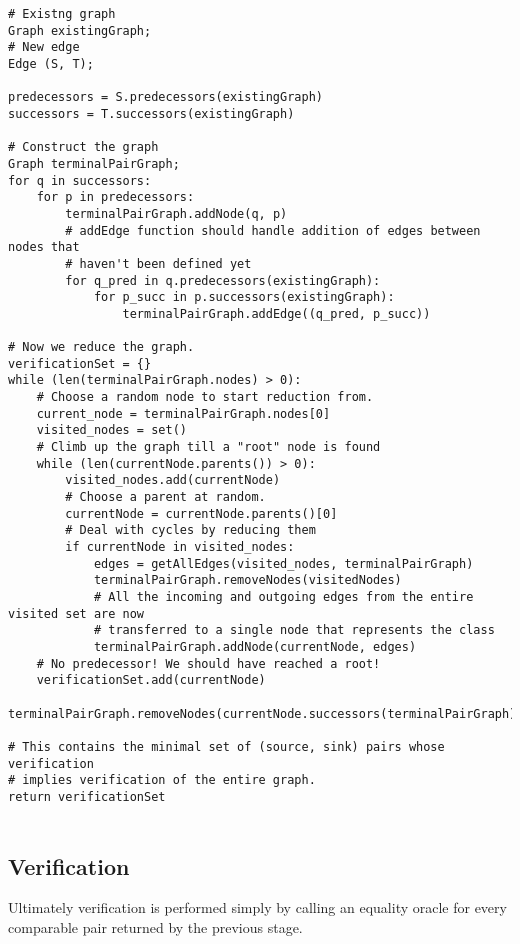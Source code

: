 \documentclass{article}
\begin{document}
\begin{verbatim}
# Existng graph
Graph existingGraph;
# New edge
Edge (S, T);

predecessors = S.predecessors(existingGraph)
successors = T.successors(existingGraph)

# Construct the graph
Graph terminalPairGraph;
for q in successors:
    for p in predecessors:
        terminalPairGraph.addNode(q, p)
        # addEdge function should handle addition of edges between nodes that 
        # haven't been defined yet
        for q_pred in q.predecessors(existingGraph):
            for p_succ in p.successors(existingGraph):
                terminalPairGraph.addEdge((q_pred, p_succ))

# Now we reduce the graph.
verificationSet = {}
while (len(terminalPairGraph.nodes) > 0):
    # Choose a random node to start reduction from.
    current_node = terminalPairGraph.nodes[0]
    visited_nodes = set()
    # Climb up the graph till a "root" node is found
    while (len(currentNode.parents()) > 0):
        visited_nodes.add(currentNode)
        # Choose a parent at random.
        currentNode = currentNode.parents()[0]
        # Deal with cycles by reducing them
        if currentNode in visited_nodes:
            edges = getAllEdges(visited_nodes, terminalPairGraph)
            terminalPairGraph.removeNodes(visitedNodes)
            # All the incoming and outgoing edges from the entire visited set are now 
            # transferred to a single node that represents the class
            terminalPairGraph.addNode(currentNode, edges)
    # No predecessor! We should have reached a root!
    verificationSet.add(currentNode)
    terminalPairGraph.removeNodes(currentNode.successors(terminalPairGraph)

# This contains the minimal set of (source, sink) pairs whose verification 
# implies verification of the entire graph. 
return verificationSet
    
\end{verbatim}


\subsection{Verification}
Ultimately verification is performed simply by calling an equality oracle for every comparable pair returned by the previous stage.
\end{document}
